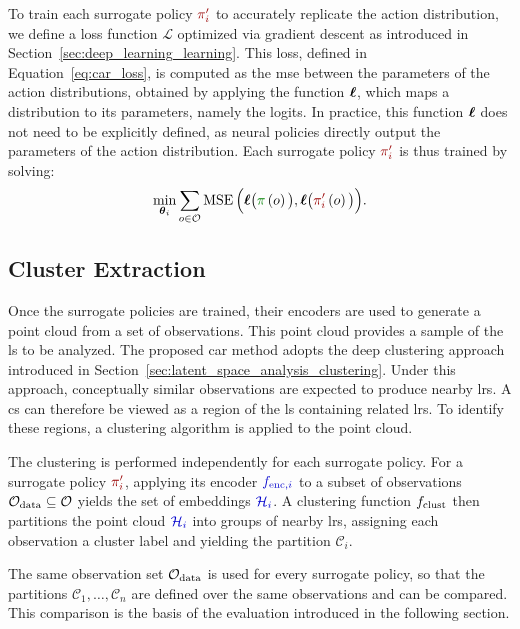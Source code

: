 

To train each surrogate policy $\SurrogatePolicy{i}$ to accurately replicate the action distribution, we define a loss function $\mathcal{L}$ optimized via gradient descent as introduced in Section~\ref{sec:deep_learning_learning}.
This loss, defined in Equation~\eqref{eq:car_loss}, is computed as the \gls{mse} between the parameters of the action distributions, obtained by applying the function $\boldsymbol{\ell}$, which maps a distribution to its parameters, namely the logits.
In practice, this function $\boldsymbol{\ell}$ does not need to be explicitly defined, as neural policies directly output the parameters of the action distribution.
Each surrogate policy $\SurrogatePolicy{i}$ is thus trained by solving:
\begin{align}
    \min_{\params_i} \sum_{o \in \ObsSet}
    \MSE\Big(
        \logits\big(\InitialPolicy\left(o\right)\big),
        \logits\big(\SurrogatePolicy{i}\left(o\right)\big)
    \Big).
    \label{eq:car_loss}
\end{align}

\subsection{Cluster Extraction}

Once the surrogate policies are trained, their encoders are used to generate a point cloud from a set of observations.
This point cloud provides a sample of the \gls{ls} to be analyzed.
The proposed \gls{car} method adopts the deep clustering approach introduced in Section~\ref{sec:latent_space_analysis_clustering}.
Under this approach, conceptually similar observations are expected to produce nearby \glspl{lr}.
A \gls{cs} can therefore be viewed as a region of the \gls{ls} containing related \glspl{lr}.
To identify these regions, a clustering algorithm is applied to the point cloud.

The clustering is performed independently for each surrogate policy.
For a surrogate policy $\SurrogatePolicy{i}$, applying its encoder $\SurrogateEncoder[i]$ to a subset of observations $\mathcal{O}_{\mathrm{data}} \subseteq \mathcal{O}$ yields the set of embeddings $\LatentSet{i}$.
A clustering function $f_{\mathrm{clust}}$ then partitions the point cloud $\LatentSet{i}$ into groups of nearby \glspl{lr}, assigning each observation a cluster label and yielding the partition $\mathcal{C}_{i}$.

The same observation set $\mathcal{O}_{\mathrm{data}}$ is used for every surrogate policy, so that the partitions $\mathcal{C}_{1}, \dots, \mathcal{C}_{n}$ are defined over the same observations and can be compared.
This comparison is the basis of the evaluation introduced in the following section.

